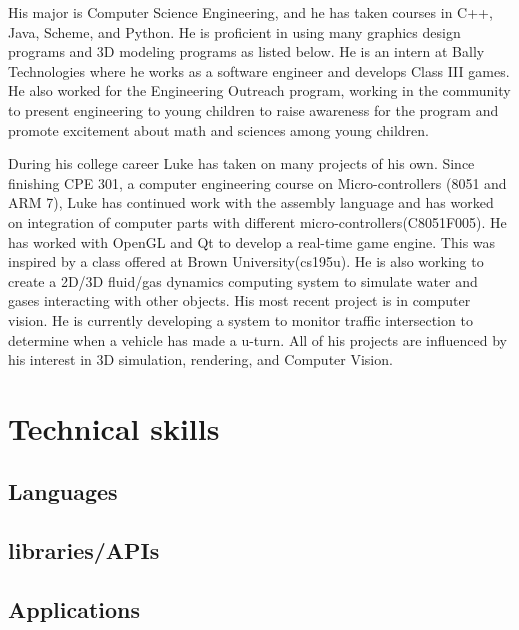 \documentclass[11pt,a4paper,sans]{moderncv}        %
\begin{document}
His major is Computer Science Engineering, and he has taken courses in C++,  Java, Scheme, and Python. He is proficient in using many graphics design programs and 3D modeling programs as listed below. He is an intern at Bally Technologies where he works as a software engineer and develops Class III games. He also worked for the Engineering Outreach program, working in the community to present engineering to young children to raise awareness for the program and promote excitement about math and sciences among young children.\vspace{.15cm}

During his college career Luke has taken on many projects of his own. Since finishing CPE 301, a computer engineering  course  on  Micro-controllers (8051 and ARM 7), Luke has continued work with the assembly language and has worked on integration of computer parts with different micro-controllers(C8051F005). He has worked with OpenGL and Qt to develop a real-time game engine. This was inspired by a class offered at Brown University(cs195u). He is also working to create a 2D/3D fluid/gas dynamics computing system to simulate water and gases interacting with other objects. His most recent project is in computer vision. He is currently developing a system to monitor traffic intersection to determine when a vehicle has made a u-turn. All of his projects are influenced by his interest in 3D simulation, rendering, and Computer Vision.\\

\section{Technical skills}
\subsection{Languages}

\subsection{libraries/APIs}

\subsection{Applications}
\end{document}
